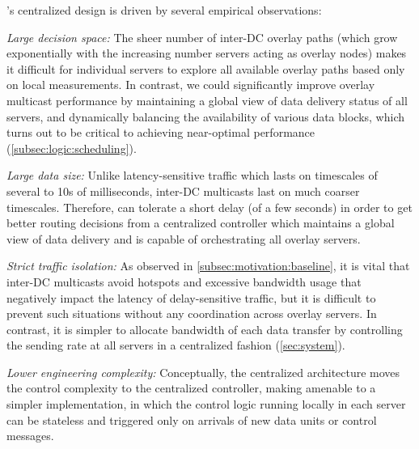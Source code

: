\name's centralized design is driven by several empirical observations:
\begin{packedenumerate}

\item {\em Large decision space:}
The sheer number of inter-DC overlay paths (which grow exponentially
with the increasing number servers acting as overlay nodes) makes it difficult for
individual servers to explore all available overlay paths based only
on local measurements. In contrast, we could significantly improve
overlay multicast performance by maintaining a global view of data
delivery status of all servers, and dynamically balancing the
availability of various data blocks, which turns out to be critical
to achieving near-optimal performance
(\Section\ref{subsec:logic:scheduling}).

\item {\em Large data size:}
Unlike latency-sensitive traffic which lasts
on timescales of several to 10s of milliseconds, inter-DC multicasts
last on much coarser timescales.
Therefore, \name can tolerate a short delay (of a few seconds) in order
to get better routing decisions from a centralized controller which
maintains a global view of data delivery and is capable of orchestrating
all overlay servers.

\item {\em Strict traffic isolation:}
As observed in \Section\ref{subsec:motivation:baseline}, it is vital
that inter-DC multicasts avoid hotspots and excessive bandwidth usage
that negatively impact the latency of delay-sensitive traffic, but
it is difficult to prevent such situations without any coordination
across overlay servers. In contrast, it is simpler to
allocate bandwidth of each data transfer by controlling the
sending rate at all servers in a centralized fashion
(\Section\ref{sec:system}).


\item {\em Lower engineering complexity:}
Conceptually, the centralized architecture moves the control
complexity to the centralized controller, making \name amenable to a
simpler implementation, in which the control logic running locally in
each server can be stateless and triggered only on arrivals of new
data units or control messages.

\end{packedenumerate}

